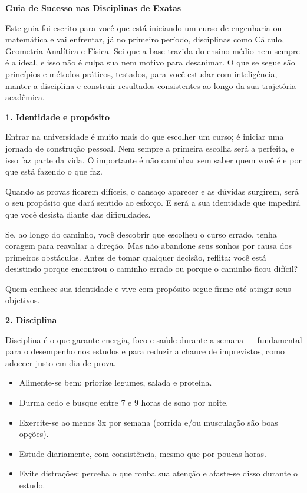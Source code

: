 \documentclass[11pt]{article}
\newcommand{\topico}[1]{%
  \vspace{7pt}
  {\Large\bfseries\color{accent} #1}\par
  \vspace{2pt}
}
\begin{document}

\begin{center}
  {\huge\bfseries\color{accent} Guia de Sucesso nas Disciplinas de Exatas}\\[4pt]
\end{center}
\vspace{4pt}

\noindent Este guia foi escrito para você que está iniciando um curso de engenharia ou matemática e vai enfrentar, já no primeiro período, disciplinas como Cálculo, Geometria Analítica e Física. Sei que a base trazida do ensino médio nem sempre é a ideal, e isso não é culpa sua nem motivo para desanimar. O que se segue são princípios e métodos práticos, testados, para você estudar com inteligência, manter a disciplina e construir resultados consistentes ao longo da sua trajetória acadêmica.

\topico{1. Identidade e propósito}

Entrar na universidade é muito mais do que escolher um curso; é iniciar uma jornada de construção pessoal. Nem sempre a primeira escolha será a perfeita, e isso faz parte da vida. O importante é não caminhar sem saber quem você é e por que está fazendo o que faz.

Quando as provas ficarem difíceis, o cansaço aparecer e as dúvidas surgirem, será o seu propósito que dará sentido ao esforço. E será a sua identidade que impedirá que você desista diante das dificuldades.

Se, ao longo do caminho, você descobrir que escolheu o curso errado, tenha coragem para reavaliar a direção. Mas não abandone seus sonhos por causa dos primeiros obstáculos. Antes de tomar qualquer decisão, reflita: você está desistindo porque encontrou o caminho errado ou porque o caminho ficou difícil?

Quem conhece sua identidade e vive com propósito segue firme até atingir seus objetivos.

\topico{2. Disciplina}
Disciplina é o que garante energia, foco e saúde durante a semana — fundamental para o desempenho nos estudos e para reduzir a chance de imprevistos, como adoecer justo em dia de prova.
\begin{itemize}
  \item Alimente-se bem: priorize legumes, salada e proteína.
  \item Durma cedo e busque entre 7 e 9 horas de sono por noite.
  \item Exercite-se ao menos 3x por semana (corrida e/ou musculação são boas opções).
  \item Estude diariamente, com consistência, mesmo que por poucas horas.
  \item Evite distrações: perceba o que rouba sua atenção e afaste-se disso durante o estudo.
\end{itemize}
\end{document}

